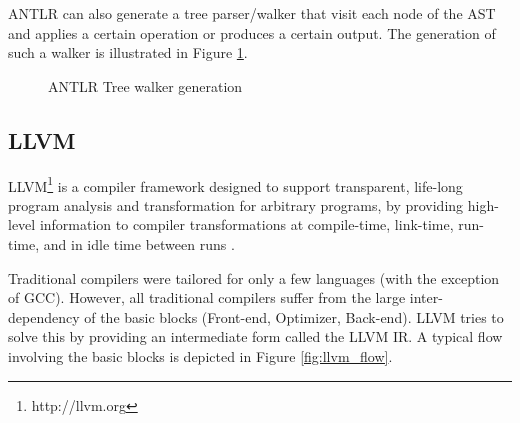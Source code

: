 ANTLR can also generate a tree parser/walker that visit each node of
the AST and applies a certain operation or produces a certain
output. The generation of such a walker is illustrated in Figure
\ref{fig:antlr_tree_walker}.

\begin{figure}[hb!]
  \centering
  \caption{ANTLR Tree walker generation}
  \label{fig:antlr_tree_walker}
\end{figure}

\subsection{LLVM}
\label{subsec:llvm}

LLVM\footnote{http://llvm.org} is a compiler framework designed to
support transparent, life-long program analysis and transformation for
arbitrary programs, by providing high-level information to compiler
transformations at compile-time, link-time, run-time, and in idle time
between runs \cite{LLVM:CGO04}.

Traditional compilers were tailored for only a few languages (with the
exception of GCC). However, all traditional compilers suffer from the
large inter-dependency of the basic blocks (Front-end, Optimizer,
Back-end). LLVM tries to solve this by providing an intermediate form
called the LLVM IR. A typical flow involving the basic blocks is
depicted in Figure \ref{fig:llvm_flow}.

